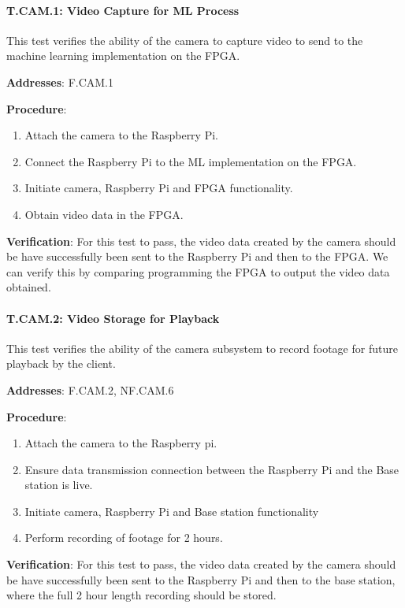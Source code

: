 \paragraph{T.CAM.1: Video Capture for ML Process}

This test verifies the ability of the camera to capture video to send to the machine learning implementation on the FPGA.

\textbf{Addresses}:  F.CAM.1

\textbf{Procedure}:
\begin{enumerate}[noitemsep]
    \item Attach the camera to the Raspberry Pi.
    \item Connect the Raspberry Pi to the ML implementation on the FPGA.
    \item Initiate camera, Raspberry Pi and FPGA functionality.
    \item Obtain video data in the FPGA.
\end{enumerate}

\textbf{Verification}: 
For this test to pass, the video data created by the camera should be have successfully been sent to the Raspberry Pi and then to the FPGA. We can verify this by comparing programming the FPGA to output the video data obtained.

%

\paragraph{T.CAM.2: Video Storage for Playback}

This test verifies the ability of the camera subsystem to record footage for future playback by the client.

\textbf{Addresses}:  F.CAM.2, NF.CAM.6

\textbf{Procedure}:
\begin{enumerate}[noitemsep]
    \item Attach the camera to the Raspberry pi.
    \item Ensure data transmission connection between the Raspberry Pi and the Base station is live.
    \item Initiate camera, Raspberry Pi and Base station functionality
    \item Perform recording of footage for 2 hours.
\end{enumerate}

\textbf{Verification}: 
For this test to pass, the video data created by the camera should be have successfully been sent to the Raspberry Pi and then to the base station, where the full 2 hour length recording should be stored. 

